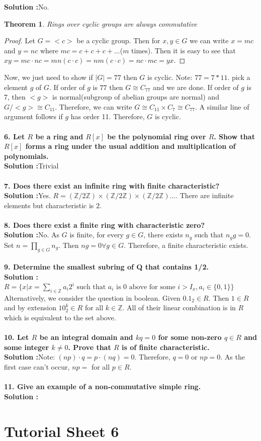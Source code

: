 \documentclass[oneside]{book}
\newtheorem{theorem}{Theorem}
\begin{document}
\textbf{Solution :}No.
\begin{theorem}
    Rings over cyclic groups are always commutative
\end{theorem}
\begin{proof}
    Let $G=<c>$ be a cyclic group. Then for $x,y\in G$ we can write $x=mc$ and $y=nc$ where $mc=c+c+c+\hdots$($m$ times). Then it is easy to see that $xy=mc\cdot nc=mn(c\cdot c)=nm(c\cdot c)=nc\cdot mc=yx$.
\end{proof}
Now, we just need to show if $|G|=77$ then $G$ is cyclic. Note: $77=7*11$. pick a element $g$ of $G$. If order of $g$ is $77$ then $G\cong C_{77}$ and we are done. If order of $g$ is 7, then $<g>$  is normal(subgroup of abelian groups are normal) and $G/<g>\cong C_{11}$. Therefore, we can write $G\cong C_{11}\times C_{7}\cong C_{77}$. A similar line of argument follows if $g$ has order 11. Therefore, $G$ is cyclic.\\\\
\textbf{6. Let $R$ be a ring and $R[x]$ be the polynomial ring over $R$. Show that $R[x]$ forms
a ring under the usual addition and multiplication of polynomials.}\\
\textbf{Solution :}Trivial\\\\
\textbf{7. Does there exist an infinite ring with finite characteristic?}\\
\textbf{Solution :}Yes. $R=\left(\mathbb{Z}/2\mathbb{Z}\right)\times \left(\mathbb{Z}/2\mathbb{Z}\right)\times \left(\mathbb{Z}/2\mathbb{Z}\right)\hdots$. There are infinite elements but characteristic is $2$.\\\\
\textbf{8. Does there exist a finite ring with characteristic zero?}\\
\textbf{Solution :}No. As $G$ is finite, for every $g\in G$, there exists $n_g$ such that $n_gg=0$. Set $n=\prod_{g\in G}n_g$. Then $ng=0\forall g\in G$. Therefore, a finite characteristic exists.\\\\
\textbf{9. Determine the smallest subring of Q that contains 1/2.}\\
\textbf{Solution :}$R=\{x|x=\sum_{i\in \mathbb Z} a_i2^i\text{ such that $a_i$ is 0 above for some $i>I_x$},a_i\in\{0,1\}\}$\\
Alternatively, we consider the question in boolean. Given $0.1_2\in R$. Then $1\in R$ and by extension $10^k_2\in R$ for all $k\in\mathbb{Z}$. All of their linear combination is in $R$ which is equivalent to the set above.\\\\
\textbf{10. Let $R$ be an integral domain and $kq = 0$ for some non-zero $q \in R$ and some integer $k\ne 0$. Prove that $R$ is of finite characteristic.}\\
\textbf{Solution :}Note: $(np)\cdot q=p\cdot(nq)=0$. Therefore, $q=0$ or $np=0$. As the first case can't occur, $np=$ for all $p\in R$.\\\\
\textbf{11. Give an example of a non-commutative simple ring.}\\
\textbf{Solution :}





\chapter{Tutorial Sheet 6}
\end{document}

